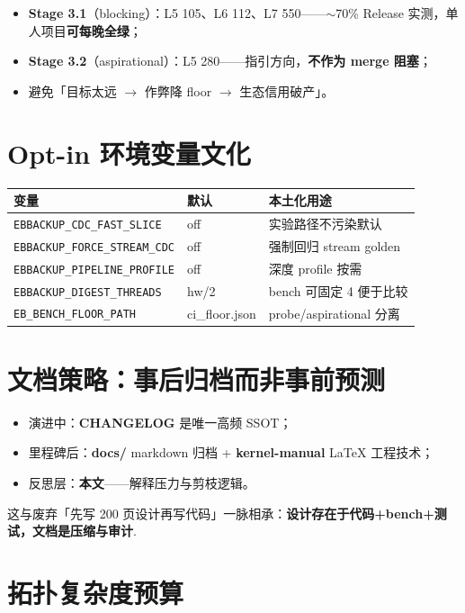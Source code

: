\begin{adaptbox}[为何需要双轨]
\begin{itemize}[nosep]
  \item \textbf{Stage 3.1}（blocking）：L5 105、L6 112、L7 550——$\sim$70\% Release 实测，单人项目\textbf{可每晚全绿}；
  \item \textbf{Stage 3.2}（aspirational）：L5 280——指引方向，\textbf{不作为 merge 阻塞}；
  \item 避免「目标太远 $\rightarrow$ 作弊降 floor $\rightarrow$ 生态信用破产」。
\end{itemize}
\end{adaptbox}

\section{Opt-in 环境变量文化}

\begin{longtable}{@{}llp{7cm}@{}}
\toprule
变量 & 默认 & 本土化用途 \\
\midrule
\texttt{EBBACKUP\_CDC\_FAST\_SLICE} & off & 实验路径不污染默认 \\
\texttt{EBBACKUP\_FORCE\_STREAM\_CDC} & off & 强制回归 stream golden \\
\texttt{EBBACKUP\_PIPELINE\_PROFILE} & off & 深度 profile 按需 \\
\texttt{EBBACKUP\_DIGEST\_THREADS} & hw/2 & bench 可固定 4 便于比较 \\
\texttt{EB\_BENCH\_FLOOR\_PATH} & ci\_floor.json & probe/aspirational 分离 \\
\bottomrule
\end{longtable}

\section{文档策略：事后归档而非事前预测}

\begin{itemize}
  \item 演进中：\textbf{CHANGELOG} 是唯一高频 SSOT；
  \item 里程碑后：\textbf{docs/} markdown 归档 + \textbf{kernel-manual} LaTeX 工程技术；
  \item 反思层：\textbf{本文}——解释压力与剪枝逻辑。
\end{itemize}

这与废弃「先写 200 页设计再写代码」一脉相承：\textbf{设计存在于代码+bench+测试，文档是压缩与审计}.

\section{拓扑复杂度预算}

